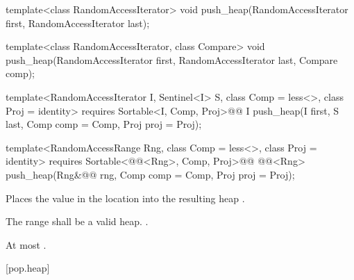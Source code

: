 %
\begin{removedblock}
\begin{itemdecl}
template<class RandomAccessIterator>
  void push_heap(RandomAccessIterator first, RandomAccessIterator last);

template<class RandomAccessIterator, class Compare>
  void push_heap(RandomAccessIterator first, RandomAccessIterator last,
                 Compare comp);
\end{itemdecl}
\end{removedblock}
\begin{addedblock}
\begin{itemdecl}
template<RandomAccessIterator I, Sentinel<I> S, class Comp = less<>,
    class Proj = identity>
  requires Sortable<I, Comp, Proj>@\newtxt{()}@
  I push_heap(I first, S last, Comp comp = Comp{}, Proj proj = Proj{});

template<RandomAccessRange Rng, class Comp = less<>, class Proj = identity>
  requires Sortable<@@<Rng>, Comp, Proj>@\newtxt{()}@
  @@<Rng>
    push_heap(Rng&@\newtxt{\&}@ rng, Comp comp = Comp{}, Proj proj = Proj{});
\end{itemdecl}
\end{addedblock}

\begin{itemdescr}
\pnum
\effects
Places the value in the location
into the resulting heap
.

\pnum
\requires
The range
shall be a valid heap.
.

\begin{addedblock}
\pnum
\returns {}
\end{addedblock}

\pnum
\complexity
At most
.
\end{itemdescr}

[pop.heap]{}


